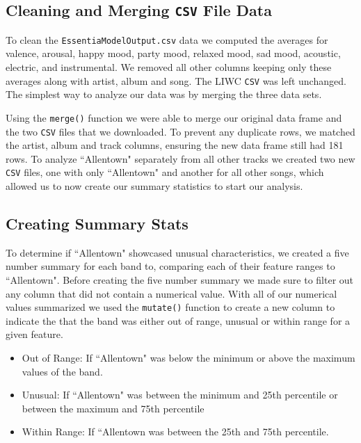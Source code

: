\documentclass{article}\usepackage[]{graphicx}\usepackage[]{xcolor}
\begin{document}
\begin{multicols}{2}
\subsection{Cleaning and Merging \texttt{CSV} File Data}
To clean the \texttt{EssentiaModelOutput.csv} data we computed the averages for valence, arousal, happy mood, party mood, relaxed mood, sad mood, acoustic, electric, and instrumental. We removed all other columns keeping only these averages along with artist, album and song. The LIWC \texttt{CSV} was left unchanged. The simplest way to analyze our data was by merging the three data sets. 

Using the \verb|merge()| function we were able to merge our original data frame and the two {\texttt{CSV}} files that we downloaded. To prevent any duplicate rows, we matched the artist, album and track columns, ensuring the new data frame still had 181 rows. To analyze ``Allentown" separately from all other tracks we created two new \texttt{CSV} files, one with only ``Allentown" and another for all other songs, which allowed us to now create our summary statistics to start our analysis. 

\subsection{Creating Summary Stats}
To determine if ``Allentown" showcased unusual characteristics, we created a five number summary for each band to, comparing each of their feature ranges to ``Allentown". Before creating the five number summary we made sure to filter out any column that did not contain a numerical value. With all of our numerical values summarized we used the \verb|mutate()| function to create a new column to indicate the that the band was either out of range, unusual or within range for a given feature.
\begin{itemize}\itemsep0em
\item Out of Range: If ``Allentown" was below the minimum or above the maximum values of the band.
\item Unusual: If ``Allentown" was between the minimum and 25th percentile or between the maximum and 75th percentile
\item Within Range: If ``Allentown was between the 25th and 75th percentile. 
\end{itemize}


\end{multicols}
\end{document}
